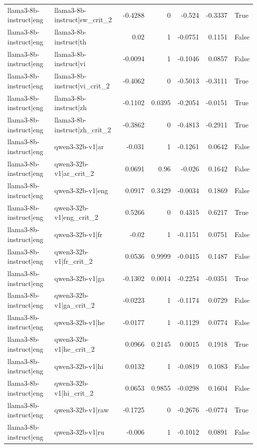 \begin{table}
\begin{tabular}{l l r r r r l}
llama3-8b-instruct|eng & llama3-8b-instruct|sw_crit_2 & -0.4288 & 0 & -0.524 & -0.3337 & True \\
llama3-8b-instruct|eng & llama3-8b-instruct|th & 0.02 & 1 & -0.0751 & 0.1151 & False \\
llama3-8b-instruct|eng & llama3-8b-instruct|vi & -0.0094 & 1 & -0.1046 & 0.0857 & False \\
llama3-8b-instruct|eng & llama3-8b-instruct|vi_crit_2 & -0.4062 & 0 & -0.5013 & -0.3111 & True \\
llama3-8b-instruct|eng & llama3-8b-instruct|zh & -0.1102 & 0.0395 & -0.2054 & -0.0151 & True \\
llama3-8b-instruct|eng & llama3-8b-instruct|zh_crit_2 & -0.3862 & 0 & -0.4813 & -0.2911 & True \\
llama3-8b-instruct|eng & qwen3-32b-v1|ar & -0.031 & 1 & -0.1261 & 0.0642 & False \\
llama3-8b-instruct|eng & qwen3-32b-v1|ar_crit_2 & 0.0691 & 0.96 & -0.026 & 0.1642 & False \\
llama3-8b-instruct|eng & qwen3-32b-v1|eng & 0.0917 & 0.3429 & -0.0034 & 0.1869 & False \\
llama3-8b-instruct|eng & qwen3-32b-v1|eng_crit_2 & 0.5266 & 0 & 0.4315 & 0.6217 & True \\
llama3-8b-instruct|eng & qwen3-32b-v1|fr & -0.02 & 1 & -0.1151 & 0.0751 & False \\
llama3-8b-instruct|eng & qwen3-32b-v1|fr_crit_2 & 0.0536 & 0.9999 & -0.0415 & 0.1487 & False \\
llama3-8b-instruct|eng & qwen3-32b-v1|ga & -0.1302 & 0.0014 & -0.2254 & -0.0351 & True \\
llama3-8b-instruct|eng & qwen3-32b-v1|ga_crit_2 & -0.0223 & 1 & -0.1174 & 0.0729 & False \\
llama3-8b-instruct|eng & qwen3-32b-v1|he & -0.0177 & 1 & -0.1129 & 0.0774 & False \\
llama3-8b-instruct|eng & qwen3-32b-v1|he_crit_2 & 0.0966 & 0.2145 & 0.0015 & 0.1918 & True \\
llama3-8b-instruct|eng & qwen3-32b-v1|hi & 0.0132 & 1 & -0.0819 & 0.1083 & False \\
llama3-8b-instruct|eng & qwen3-32b-v1|hi_crit_2 & 0.0653 & 0.9855 & -0.0298 & 0.1604 & False \\
llama3-8b-instruct|eng & qwen3-32b-v1|raw & -0.1725 & 0 & -0.2676 & -0.0774 & True \\
llama3-8b-instruct|eng & qwen3-32b-v1|ru & -0.006 & 1 & -0.1012 & 0.0891 & False \\

\end{tabular}
\end{table}
